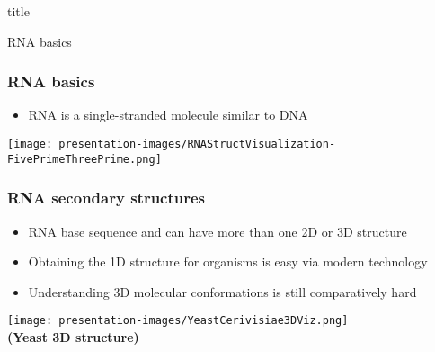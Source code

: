 \documentclass[usenames,svgnames,dvipsnames,11pt]{beamer}
\newcommand{\TitleBoxed}[1]{
     \begin{beamercolorbox}[sep=8pt,center,shadow=true,rounded=true]{title}
          \usebeamerfont{title}#1\par%
     \end{beamercolorbox}
}
\begin{document}
\begin{frame}
\TitleBoxed{
     \Huge{\centerline{RNA basics}}
}
\end{frame}

\begin{frame}
\frametitle{RNA basics}
\begin{itemize} 

\item RNA is a single-stranded molecule similar to DNA 

\end{itemize}

\begin{center}
\texttt{[image: presentation-images/RNAStructVisualization-FivePrimeThreePrime.png]} \\ 
\end{center}

\end{frame}

\begin{frame}
\frametitle{RNA secondary structures}
\begin{itemize} 

\item RNA base sequence and can have more than one 
      2D or 3D structure 
\item Obtaining the 1D structure for organisms is easy via modern technology
\item Understanding 3D molecular conformations is still comparatively hard 

\end{itemize}

\begin{center}
\texttt{[image: presentation-images/YeastCerivisiae3DViz.png]} \\ 
\textbf{(Yeast 3D structure)}
\end{center}

\end{frame}
\end{document}
